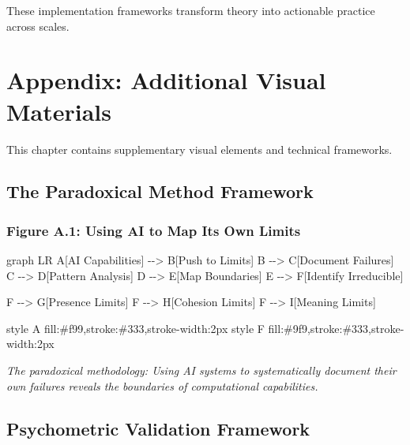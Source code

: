 \documentclass[
  a4paper,
]{report}
\newenvironment{Shaded}{\begin{snugshade}}{\end{snugshade}}
\newcommand{\NormalTok}[1]{\textcolor[rgb]{0.00,0.23,0.31}{#1}}
\begin{document}
These implementation frameworks transform theory into actionable
practice across scales.


\chapter{Appendix: Additional Visual
Materials}\label{appendix-additional-visual-materials}

This chapter contains supplementary visual elements and technical
frameworks.

\section{The Paradoxical Method
Framework}\label{the-paradoxical-method-framework}

\subsection{Figure A.1: Using AI to Map Its Own
Limits}\label{figure-a.1-using-ai-to-map-its-own-limits}

\begin{Shaded}
\begin{Highlighting}[]
\NormalTok{graph LR}
\NormalTok{    A[AI Capabilities] {-}{-}\textgreater{} B[Push to Limits]}
\NormalTok{    B {-}{-}\textgreater{} C[Document Failures]}
\NormalTok{    C {-}{-}\textgreater{} D[Pattern Analysis]}
\NormalTok{    D {-}{-}\textgreater{} E[Map Boundaries]}
\NormalTok{    E {-}{-}\textgreater{} F[Identify Irreducible]}
    
\NormalTok{    F {-}{-}\textgreater{} G[Presence Limits]}
\NormalTok{    F {-}{-}\textgreater{} H[Cohesion Limits]}
\NormalTok{    F {-}{-}\textgreater{} I[Meaning Limits]}
    
\NormalTok{    style A fill:\#f99,stroke:\#333,stroke{-}width:2px}
\NormalTok{    style F fill:\#9f9,stroke:\#333,stroke{-}width:2px}
\end{Highlighting}
\end{Shaded}

\emph{The paradoxical methodology: Using AI systems to systematically
document their own failures reveals the boundaries of computational
capabilities.}

\section{Psychometric Validation
Framework}\label{psychometric-validation-framework}
\end{document}
